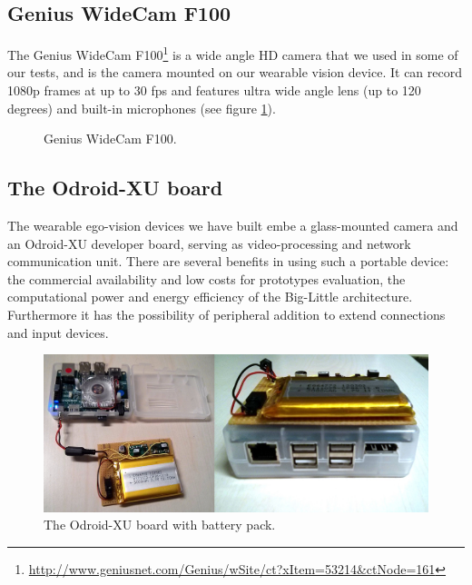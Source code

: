 \subsection{Genius WideCam F100}
The Genius WideCam F100\footnote{\url{http://www.geniusnet.com/Genius/wSite/ct?xItem=53214&ctNode=161}} is a wide angle HD camera that we used in some of our tests, and is the camera mounted on our wearable vision device. It can record 1080p frames at up to 30 fps and features ultra wide angle lens (up to 120 degrees) and built-in microphones (see figure \ref{fig:wide-camera}).

\begin{figure}[tb]
\centering
{}
\caption{Genius WideCam F100.}
\label{fig:wide-camera}
\end{figure}

\subsection{The Odroid-XU board}
The wearable ego-vision devices we have built embe a glass-mounted camera and an Odroid-XU developer board, serving as video-processing and network communication unit.
There are several benefits in using such a portable device: the commercial availability and low costs for prototypes evaluation, the computational power and energy efficiency of the Big-Little architecture. Furthermore it has the possibility  of peripheral addition to extend connections and input devices. 

\begin{figure}[t!]
\centering
\includegraphics[width=0.6\linewidth]{Figures/board.jpg}
\caption{The Odroid-XU board with battery pack.}
\label{board}
\end{figure}

